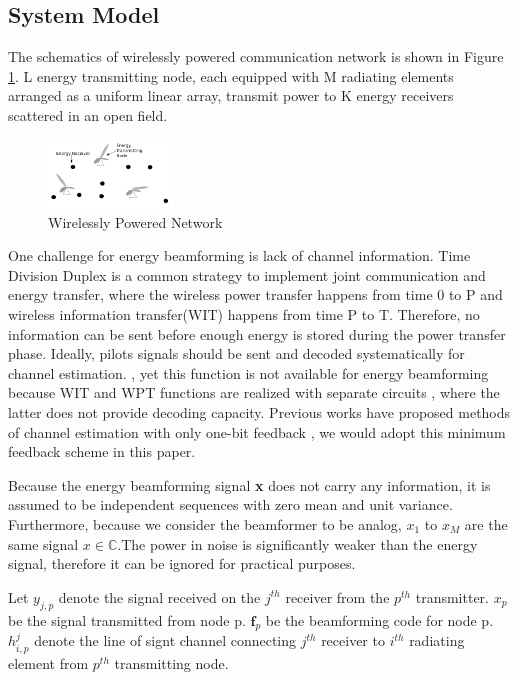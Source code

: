 \documentclass[journal]{IEEEtran}
\begin{document}
\subsection{System Model}

The schematics of wirelessly powered communication network is shown in Figure \ref{fig:MIMO}. L energy transmitting node, each equipped with M radiating elements arranged as a uniform linear array, transmit power to K energy receivers scattered in an open field.

\begin{figure}[H]
    \centering
    \includegraphics[width=0.3\textwidth]{6.png}
    \caption{Wirelessly Powered Network}
    \label{fig:MIMO}
\end{figure}

One challenge for energy beamforming is lack of channel information. Time Division Duplex is a common strategy to implement joint communication and energy transfer, where the wireless power transfer happens from time 0 to P and wireless information transfer(WIT) happens from time P to T. Therefore, no information can be sent before enough energy is stored during the power transfer phase. Ideally, pilots signals should be sent and decoded systematically for channel estimation. \cite{1597555}, yet this function is not available for energy beamforming because WIT and WPT functions are realized with separate circuits \cite{7462480}, where the latter does not provide decoding capacity. Previous works have proposed methods of channel estimation with only one-bit feedback \cite{6884811}, we would adopt this minimum feedback scheme in this paper.

Because the energy beamforming signal \textbf{x} does not carry any information, it is assumed to be independent sequences with zero mean and unit variance. \cite{6884811} Furthermore, because we consider the beamformer to be analog, $x_1$ to $x_M$ are the same signal $x \in \mathbb{C}$.The power in noise is significantly weaker than the energy signal, therefore it can be ignored for practical purposes.

Let $y_{j,p}$ denote the signal received on the $j^{th}$ receiver from the $p^{th}$ transmitter. $x_p$ be the signal transmitted from node p. $\textbf{f}_p$ be the beamforming code for node p.  $h_{i,p}^j$ denote the line of signt channel connecting $j^{th}$ receiver to $i^{th}$ radiating element from $p^{th}$ transmitting node.
\end{document}
